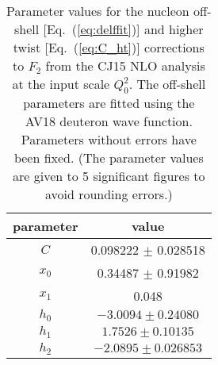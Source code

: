 \documentclass[aps,prd,amsmath,preprint]{revtex4}
\begin{document}
\begin{table}[h]
\begin{center}
\caption{Parameter values for the nucleon off-shell
	[Eq.~(\ref{eq:delffit})] and higher twist
	[Eq.~(\ref{eq:C_ht})] corrections to $F_2$ from
	the CJ15 NLO analysis at the input scale $Q_0^2$.
	The off-shell parameters are fitted using the
	AV18 deuteron wave function.
	Parameters without errors have been fixed.
	(The parameter values are given to 5 significant
	figures to avoid rounding errors.) \\}
{\scriptsize
\begin{tabular}{c|c}\hline
parameter	& value				\\ \hline
$C$ 		& 0.098222 $\pm$ 0.028518	\\
$x_0$ 		& 0.34487  $\pm$ 0.91982	\\
$x_1$		& 0.048				\\ \hline
%
$h_0$		& $-3.0094 \pm 0.24080$		\\    
$h_1$ 		& $ 1.7526 \pm 0.10135$         \\       
$h_2$ 		& $-2.0895 \pm 0.026853$        \\ \hline
\end{tabular}
}
\label{tab:other_params}
\end{center}
\end{table}
\end{document}
